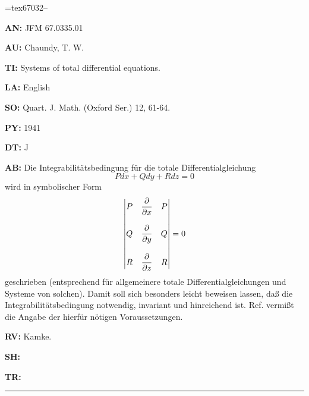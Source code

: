 
\vsize=21cm
\parindent0pt
\footline={\hss\rm tex67032--\folio\hss}
\frenchspacing

\item{\bf AN:} JFM 67.0335.01
\item{\bf AU:} Chaundy, T. W.
\item{\bf TI:} Systems of total differential equations.
\item{\bf LA:} English
\item{\bf SO:} Quart. J. Math. (Oxford Ser.) 12, 61-64.
\item{\bf PY:} 1941
\item{\bf DT:} J
\item{\bf AB:}{\parindent15pt
 Die Integrabilit\"atsbedingung f\"ur die totale Differentialgleichung
$$
Pdx + Qdy + Rdz = 0
$$
wird in symbolischer Form
$$
\vmatrix
P&\dfrac{\partial}{\partial x}&P\\
&&\\
Q&\dfrac{\partial }{\partial y}& Q\\
&&\\
R&\dfrac{\partial}{\partial z}& R
\endvmatrix=0
$$
geschrieben (entsprechend f\"ur allgemeinere totale Differentialgleichungen und
Systeme von solchen).
Damit soll sich besonders leicht beweisen lassen, da{\ss} die
Integrabilit\"atsbedingung
notwendig, invariant und hinreichend ist. Ref. vermi{\ss}t
die
Angabe der hierf\"ur n\"otigen Voraussetzungen.
}
\item{\bf RV:} Kamke.
\item{\bf SH:}
\item{\bf TR:}

\bigskip\par\noindent\hrule\bigskip\par


